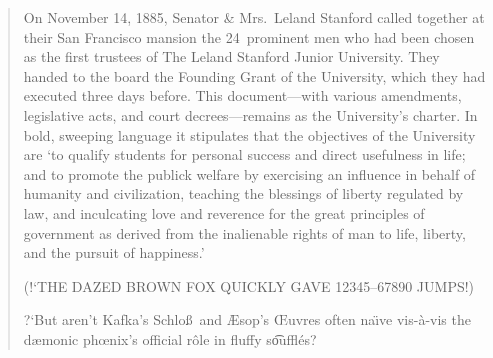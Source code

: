 \documentclass{article}
\begin{document}
\begin{quote}
  \begin{flushleft}
    On November 14, 1885, Senator \& Mrs.~Leland Stanford called
    together at their San Francisco mansion the 24~prominent men who
    had been chosen as the first trustees of The Leland Stanford
    Junior University. They handed to the board the Founding Grant
    of the University, which they had executed three days before.
    This document---with various amendments, legislative acts, and
    court decrees---remains as the University's charter. In bold,
    sweeping language it stipulates that the objectives of the
    University are `to qualify students for personal success and
    direct usefulness in life; and to promote the publick welfare by
    exercising an influence in behalf of humanity and civilization,
    teaching the blessings of liberty regulated by law, and
    inculcating love and reverence for the great principles of
    government as derived from the inalienable rights of man to life,
    liberty, and the pursuit of happiness.'
    
    (!`THE DAZED BROWN FOX QUICKLY GAVE 12345--67890 JUMPS!)
    
    ?`But aren't Kafka's Schlo\ss\
    and \AE sop's \OE uvres often na\"\i ve vis-\`a-vis the
    d\ae monic ph\oe nix's official r\^ole in fluffy s\t ouffl\'es?
  \end{flushleft}
\end{quote}

\clearpage

\kant

\clearpage

\lipsum
\end{document}
